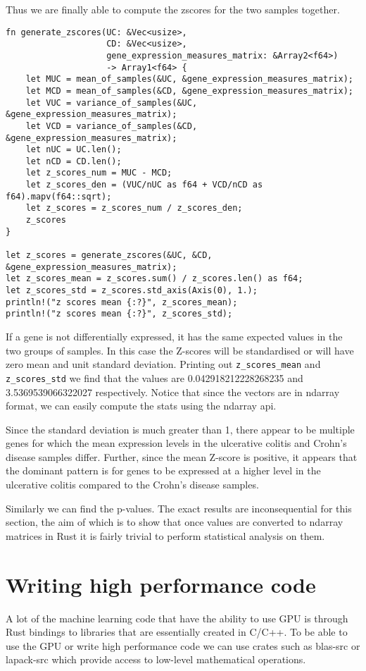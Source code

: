 \documentclass{book}
\begin{document}
Thus we are finally able to compute the zscores for the two samples together.

\begin{lstlisting}[caption={chapter7/statistics/src/main.rs}, basicstyle=\small]
fn generate_zscores(UC: &Vec<usize>,
                    CD: &Vec<usize>,
                    gene_expression_measures_matrix: &Array2<f64>)
                    -> Array1<f64> {
    let MUC = mean_of_samples(&UC, &gene_expression_measures_matrix);
    let MCD = mean_of_samples(&CD, &gene_expression_measures_matrix);
    let VUC = variance_of_samples(&UC, &gene_expression_measures_matrix);
    let VCD = variance_of_samples(&CD, &gene_expression_measures_matrix);
    let nUC = UC.len();
    let nCD = CD.len();
    let z_scores_num = MUC - MCD;
    let z_scores_den = (VUC/nUC as f64 + VCD/nCD as f64).mapv(f64::sqrt);
    let z_scores = z_scores_num / z_scores_den;
    z_scores
}

let z_scores = generate_zscores(&UC, &CD, &gene_expression_measures_matrix);
let z_scores_mean = z_scores.sum() / z_scores.len() as f64;
let z_scores_std = z_scores.std_axis(Axis(0), 1.);
println!("z scores mean {:?}", z_scores_mean);
println!("z scores mean {:?}", z_scores_std);
\end{lstlisting}

If a gene is not differentially expressed, it has the same expected values in the two groups of samples. In this case the Z-scores will be standardised or will have zero mean and unit standard deviation. Printing out \lstinline{z_scores_mean} and \lstinline{z_scores_std} we find that the values are 0.042918212228268235 and 3.5369539066322027 respectively. Notice that since the vectors are in ndarray format, we can easily compute the stats using the ndarray api.

Since the standard deviation is much greater than 1, there appear to be multiple genes for which the mean expression levels in the ulcerative colitis and Crohn's disease samples differ. Further, since the mean Z-score is positive, it appears that the dominant pattern is for genes to be expressed at a higher level in the ulcerative colitis compared to the Crohn's disease samples.

Similarly we can find the p-values. The exact results are inconsequential for this section, the aim of which is to show that once values are converted to ndarray matrices in Rust it is fairly trivial to perform statistical analysis on them.
\label{sec:Statistical Analysis}

\section{Writing high performance code}%
A lot of the machine learning code that have the ability to use GPU is through Rust bindings to libraries that are essentially created in C/C++. To be able to use the GPU or write high performance code we can use crates such as blas-src or lapack-src which provide access to low-level mathematical operations.
\end{document}
